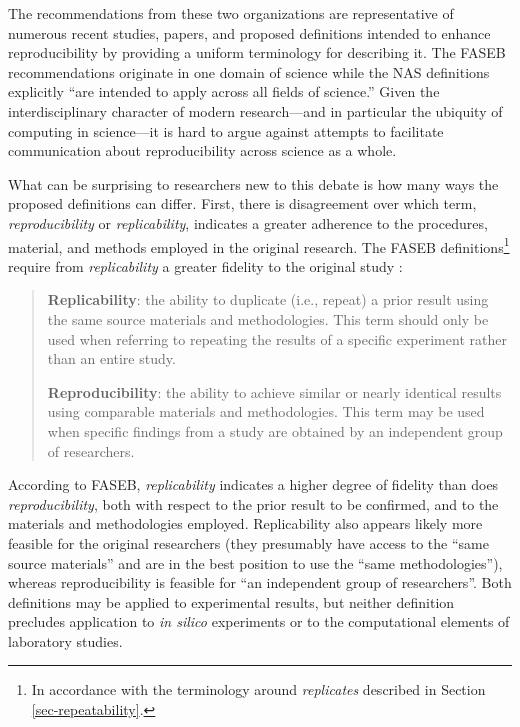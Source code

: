 The recommendations from these two organizations are representative of numerous recent studies, papers,
	and proposed definitions intended to enhance reproducibility by providing a uniform terminology
	for describing it.
The FASEB recommendations originate in one domain of science while the NAS definitions explicitly
	``are intended to apply across all fields of science.''
Given the interdisciplinary character of modern research---and in particular the ubiquity of computing in science---it
	is hard to argue against attempts to facilitate communication about reproducibility across science as a whole.

What can be surprising to researchers new to this debate is how many ways the proposed definitions
	can differ.
First, there is disagreement over which term, \emph{reproducibility} or \emph{replicability}, indicates
	 a greater adherence to the procedures, material,  and methods employed in the original research.
The FASEB definitions\footnote{In accordance with the terminology around \emph{replicates} described in Section\,\ref{sec-repeatability}.}
	require from \emph{replicability} a greater fidelity to the original study \cite[p.3]{FASEB2016enhancing}:
        \begin{quote}
          \textbf{Replicability}: the ability to duplicate (i.e., repeat) a prior result using the same
          source materials and methodologies. This term should only be used when
	referring to repeating the results of a specific experiment rather than an
	entire study. \medskip

	\textbf{Reproducibility}: the ability to achieve similar or nearly identical results using comparable materials and methodologies.
	This term may be used when specific findings from a study are obtained by an independent group of researchers.
      \end{quote}
According to FASEB, \emph{replicability} indicates a higher degree of fidelity than does \emph{reproducibility},
	both with respect to the prior result to be confirmed, and to the materials and methodologies employed.
Replicability also appears likely more feasible for the original researchers (they presumably have access to the
	``same source materials'' and are in the best position to use the ``same methodologies''), whereas reproducibility is
	feasible for ``an independent group of researchers''.
Both definitions may be applied to experimental results, but neither definition precludes application to \emph{in silico}
	experiments or to the computational elements of laboratory studies.

